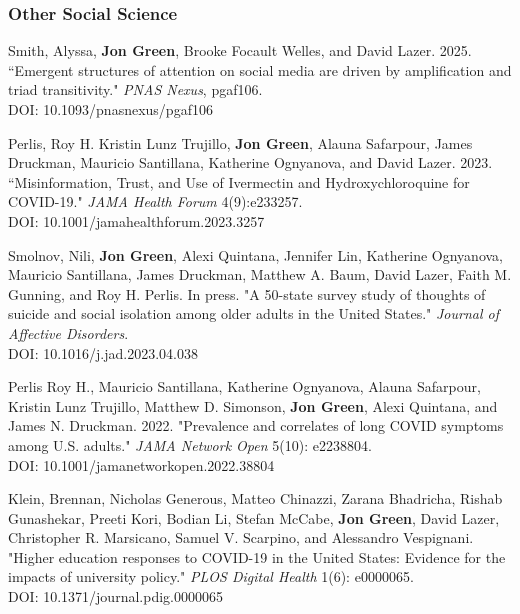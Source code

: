 \documentclass[letterpaper]{article}
\begin{document}
\subsubsection*{Other Social Science}

\begin{etaremune}

\item Smith, Alyssa, \textbf{Jon Green}, Brooke Focault Welles, and David Lazer. 2025. ``Emergent structures of attention on social media are driven by amplification and triad transitivity." \textit{PNAS Nexus}, pgaf106.\\
DOI: 10.1093/pnasnexus/pgaf106

\item Perlis, Roy H. Kristin Lunz Trujillo, \textbf{Jon Green}, Alauna Safarpour, James Druckman, Mauricio Santillana, Katherine Ognyanova, and David Lazer. 2023. ``Misinformation, Trust, and Use of Ivermectin and Hydroxychloroquine for COVID-19." \textit{JAMA Health Forum} 4(9):e233257. \\
DOI: 10.1001/jamahealthforum.2023.3257

\item Smolnov, Nili, \textbf{Jon Green}, Alexi Quintana, Jennifer Lin, Katherine Ognyanova, Mauricio Santillana, James Druckman, Matthew A. Baum, David Lazer, Faith M. Gunning, and Roy H. Perlis. In press. "A 50-state survey study of thoughts of suicide and social isolation among older adults in the United States." \textit{Journal of Affective Disorders}. \\
DOI: 10.1016/j.jad.2023.04.038

\item Perlis Roy H., Mauricio Santillana, Katherine Ognyanova, Alauna Safarpour, Kristin Lunz Trujillo, Matthew D. Simonson, \textbf{Jon Green}, Alexi Quintana, and James N. Druckman. 2022. "Prevalence and correlates of long COVID symptoms among U.S. adults." \textit{JAMA Network Open} 5(10): e2238804. \\
DOI: 10.1001/jamanetworkopen.2022.38804

\item Klein, Brennan, Nicholas Generous, Matteo Chinazzi, Zarana Bhadricha, Rishab Gunashekar, Preeti Kori, Bodian Li, Stefan McCabe, \textbf{Jon Green}, David Lazer, Christopher R. Marsicano, Samuel V. Scarpino, and Alessandro Vespignani. "Higher education responses to COVID-19 in the United States: Evidence for the impacts of university policy." \textit{PLOS Digital Health} 1(6): e0000065. \\
DOI: 10.1371/journal.pdig.0000065


\end{etaremune}
\end{document}
